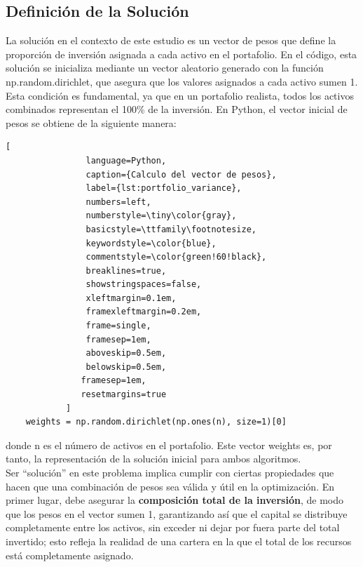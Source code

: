 \documentclass[9pt,a4paper,twoside]{rho-class/rho}
\begin{document}
        \subsection{Definición de la Solución}
            La solución en el contexto de este estudio es un vector de pesos que define la proporción de inversión asignada a cada activo en el portafolio. En el código, esta solución se inicializa mediante un vector aleatorio generado con la función np.random.dirichlet, que asegura que los valores asignados a cada activo sumen 1. Esta condición es fundamental, ya que en un portafolio realista, todos los activos combinados representan el 100\% de la inversión.
            En Python, el vector inicial de pesos se obtiene de la siguiente manera:

            \begin{lstlisting}[
                language=Python,
                caption={Calculo del vector de pesos},
                label={lst:portfolio_variance},
                numbers=left,
                numberstyle=\tiny\color{gray},
                basicstyle=\ttfamily\footnotesize,
                keywordstyle=\color{blue},
                commentstyle=\color{green!60!black},
                breaklines=true,
                showstringspaces=false,
                xleftmargin=0.1em,
                framexleftmargin=0.2em,
                frame=single,
                framesep=1em,
                aboveskip=0.5em,
                belowskip=0.5em,
               framesep=1em,
               resetmargins=true
            ]
    weights = np.random.dirichlet(np.ones(n), size=1)[0]
            \end{lstlisting}
            donde n es el número de activos en el portafolio. Este vector weights es, por tanto, la representación de la solución inicial para ambos algoritmos.\\
            Ser ``solución'' en este problema implica cumplir con ciertas propiedades que hacen que una combinación de pesos sea válida y útil en la optimización. En primer lugar, debe asegurar la \textbf{composición total de la inversión}, de modo que los pesos en el vector sumen 1, garantizando así que el capital se distribuye completamente entre los activos, sin exceder ni dejar por fuera parte del total invertido; esto refleja la realidad de una cartera en la que el total de los recursos está completamente asignado.
\end{document}
